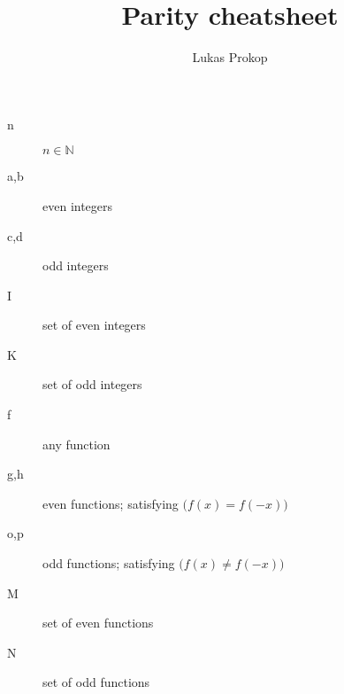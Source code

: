 \documentclass[10pt]{article}
\author{Lukas Prokop}
\title{Parity cheatsheet}
\begin{document}
\maketitle

\begin{center}
  \begin{boxedminipage}{0.5\textwidth}
    \begin{description}
      \item[n] $n \in \mathbb{N}$
      \item[a,b] even integers
      \item[c,d] odd integers
      \item[I] set of even integers
      \item[K] set of odd integers
      \item[f] any function
      \item[g,h] even functions; satisfying $\big( f(x) = f(-x) \big)$
      \item[o,p] odd functions; satisfying $\big( f(x) \neq f(-x) \big)$
      \item[M] set of even functions
      \item[N] set of odd functions
    \end{description}
  \end{boxedminipage}
\end{center}
\end{document}
